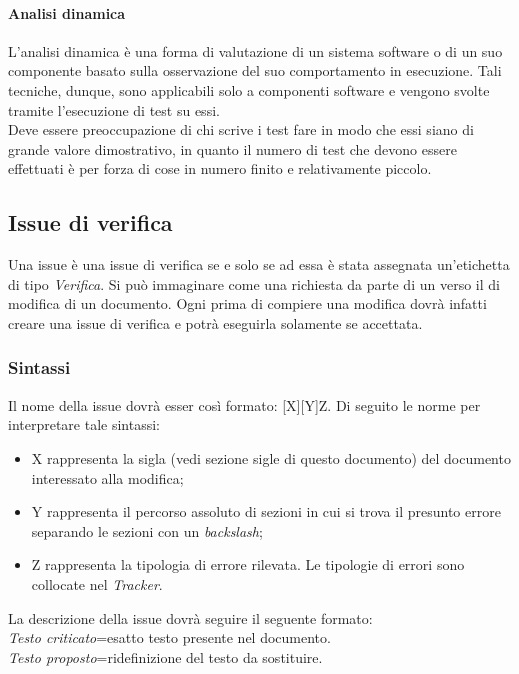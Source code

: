 			\paragraph{Analisi dinamica}
				L'analisi dinamica è una forma di valutazione di un sistema software o di un suo componente basato sulla osservazione del suo comportamento in esecuzione. Tali tecniche, dunque, sono applicabili solo a componenti software e vengono svolte tramite l'esecuzione di test su essi.\\
				Deve essere preoccupazione di chi scrive i test fare in modo che essi siano di grande valore dimostrativo, in quanto il numero di test che devono essere effettuati è per forza di cose in numero finito e relativamente piccolo.
				
	\subsection{Issue di verifica}
		Una issue è una issue di verifica se e solo se ad essa è stata assegnata un'etichetta di tipo \textit{Verifica}. Si può immaginare come una richiesta da parte di un  verso il  di modifica di un documento. Ogni  prima di compiere una modifica dovrà infatti creare una issue di verifica e potrà eseguirla solamente se accettata.\\
		\subsubsection{Sintassi}
			Il nome della issue dovrà esser così formato: [X][Y]Z.
			Di seguito le norme per interpretare tale sintassi:
			\begin{itemize}
				\item X rappresenta la sigla (vedi sezione sigle di questo documento) del documento interessato alla modifica;
				\item Y rappresenta il percorso assoluto di sezioni in cui si trova il presunto errore separando le sezioni con un \textit{backslash};
				\item Z rappresenta la tipologia di errore rilevata. Le tipologie di errori sono collocate nel \textit{Tracker}.
			\end{itemize}
			La descrizione della issue dovrà seguire il seguente formato:\\
			\textit{Testo criticato}=esatto testo presente nel documento.\\
			\textit{Testo proposto}=ridefinizione del testo da sostituire.
			
